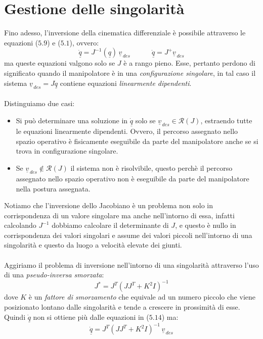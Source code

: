\section{Gestione delle singolarità}
Fino adesso, l'inversione della cinematica differenziale è possibile attraverso le equazioni ($5.9$) e ($5.1$), ovvero:
\begin{equation}
	\underline{\dot{q}} = J^{-1}(\underline{q})\,\underline{v}_{\,des} \quad\qquad \underline{\dot{q}} = J^+\underline{v}_{\,des}
\end{equation}  
ma queste equazioni valgono solo se $J$ è a rango pieno. Esse, pertanto perdono di significato quando il manipolatore è in una \emph{configurazione singolare}, in tal caso il sistema $\underline{v}_{\,des} = J\underline{\dot{q}}$ contiene equazioni \emph{linearmente dipendenti}.
\paragraph{}
Distinguiamo due casi:
\begin{itemize}
	\item Si può determinare una soluzione in $\underline{\dot{q}}$ solo se $\underline{v}_{\,des}\in \mathcal{R}(J)$, estraendo tutte le equazioni linearmente dipendenti. Ovvero, il percorso assegnato nello spazio operativo è fisicamente eseguibile da parte del manipolatore anche se si trova in configurazione singolare.
	\item Se $\underline{v}_{\,des}\not\in \mathcal{R}(J)$ il sistema non è risolvibile, questo perchè il percorso assegnato nello spazio operativo non è eseguibile da parte del manipolatore nella postura assegnata.
\end{itemize}
Notiamo che l'inversione dello Jacobiano è un problema non solo in corrispondenza di un valore singolare ma anche nell'intorno di essa, infatti calcolando $J^{-1}$ dobbiamo calcolare il determinante di $J$, e questo è nullo in corrispondenza dei valori singolari e assume dei valori piccoli nell'intorno di una singolarità e questo da luogo a velocità elevate dei giunti.
\paragraph{}
Aggiriamo il problema di inversione nell'intorno di una singolarità attraverso l'uso di una \emph{pseudo-inversa smorzata}:
\begin{equation}
	J^* = J^T(JJ^T + K^2I)^{-1}
\end{equation}
dove $K$ è un \emph{fattore di smorzamento} che equivale ad un numero piccolo che viene posizionato lontano dalle singolarità e tende a crescere in prossimità di esse. Quindi $\underline{\dot{q}}$ non si ottiene più dalle equazioni in ($5.14$) ma:
\begin{equation}
	\underline{\dot{q}} = J^T(JJ^T + K^2I)^{-1} \,\underline{v}_{\,des}
\end{equation}

